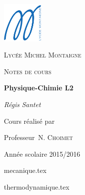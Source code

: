 \documentclass[12pt]{book}
\theoremstyle{definition}
\theoremstyle{remark}
\begin{document}
\begin{titlepage}
    \centering
    \includegraphics[width=0.15\textwidth]{img/logo_lycee_michel_montaigne.png}\par\vspace{1cm}
    {\scshape Lycée Michel Montaigne \par}
    \vspace{1cm}
    {\scshape\Large Notes de cours\par}
    \vspace{1.5cm}
    {\huge\bfseries Physique-Chimie L2\par}
    \vspace{2cm}
    {\Large\itshape Régis Santet\par}
    \vfill
    Cours réalisé par\par
    Professeur~N. \textsc{Choimet}

    \vfill

    {\large Année scolaire 2015/2016\par}
\end{titlepage}

\dominitoc %
\tableofcontents

{mecanique.tex}

{thermodynamique.tex}
\end{document}
